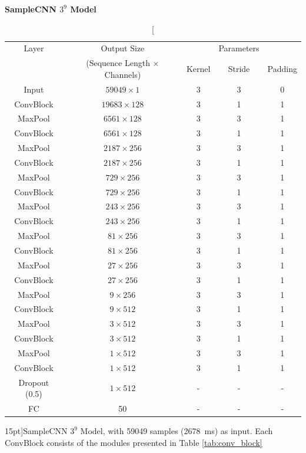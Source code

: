 \begin{table}[t]
    \centering
    \textbf{SampleCNN $3^9$ Model} \\
    \begin{tabular}{ccccc}
        \toprule Layer & Output Size & & Parameters & \\
        & (Sequence Length $\times$ Channels) & Kernel & Stride & Padding \\\hline
        Input & $59049 \times 1$ & 3 & 3 & 0 \\\hline
        ConvBlock & $19683 \times 128$ & 3 & 1 & 1 \\
        MaxPool & $6561 \times 128$ & 3 & 3 & 1 \\\hline
        ConvBlock & $6561 \times 128$ & 3 & 1 & 1 \\
        MaxPool & $2187 \times 256$ & 3 & 3 & 1 \\\hline
        ConvBlock & $2187 \times 256$ & 3 & 1 & 1 \\
        MaxPool & $729 \times 256$ & 3 & 3 & 1 \\\hline
        ConvBlock & $729 \times 256$ & 3 & 1 & 1 \\
        MaxPool & $243 \times 256$ & 3 & 3 & 1 \\\hline
        ConvBlock & $243 \times 256$ & 3 & 1 & 1 \\
        MaxPool & $81 \times 256$ & 3 & 3 & 1 \\\hline
        ConvBlock & $81 \times 256$ & 3 & 1 & 1 \\
        MaxPool & $27 \times 256$ & 3 & 3 & 1 \\\hline
        ConvBlock & $27 \times 256$ & 3 & 1 & 1 \\
        MaxPool & $9 \times 256$ & 3 & 3 & 1 \\\hline
        ConvBlock & $9 \times 512$ & 3 & 1 & 1 \\
        MaxPool & $3 \times 512$ & 3 & 3 & 1 \\\hline
        ConvBlock & $3 \times 512$ & 3 & 1 & 1 \\
        MaxPool & $1 \times 512$ & 3 & 3 & 1 \\\hline
        ConvBlock & $1 \times 512$ & 3 & 1 & 1 \\
        Dropout (0.5) & $1 \times 512$ & - & - & - \\\hline
        FC & 50 & - & - & - \\
        \bottomrule
    \end{tabular}
    \caption[][15pt]{SampleCNN $3^9$ Model, with 59049 samples (2678~ms) as input.
Each ConvBlock consists of the modules presented in Table \ref{tab:conv_block}}
    \label{tab:samplecnn_model}
\end{table}


